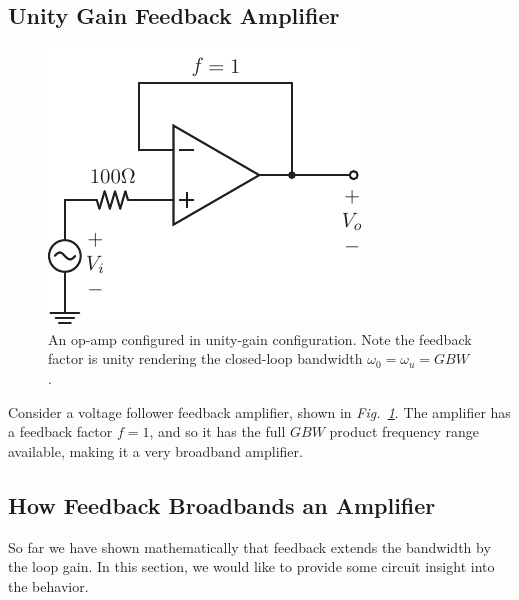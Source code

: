 \subsection{Unity Gain Feedback Amplifier}
\begin{figure}[tb]
\centering
\includegraphics[scale=1]{opamp_unitygain}
\caption{An op-amp configured in unity-gain configuration.  Note the feedback factor is unity rendering the closed-loop bandwidth $\omega_0 = \omega_u = GBW$.}
\label{fig:opamp_unitygain}
\end{figure}
Consider a voltage follower feedback amplifier, shown in \emph{Fig.~\ref{fig:opamp_unitygain}}.  The amplifier has a feedback factor $f = 1$, and so it has the full $GBW$ product frequency range available, making it a very broadband amplifier.
\subsection{How Feedback Broadbands an Amplifier}
So far we have shown mathematically that feedback extends the bandwidth by the loop gain. In this section, we would like to provide some circuit insight into the behavior.
